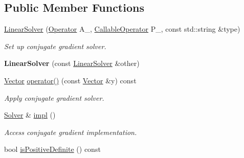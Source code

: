 \subsection*{Public Member Functions}
\begin{DoxyCompactItemize}
\item 
\hyperlink{classSpacy_1_1CG_1_1LinearSolver_a32f75ae5c449772649af6306b6f68497}{Linear\-Solver} (\hyperlink{classSpacy_1_1Operator}{Operator} A\-\_\-, \hyperlink{namespaceSpacy_a022a87afa759e18781dd2aea9a80cd73}{Callable\-Operator} P\-\_\-, const std\-::string \&type)
\begin{DoxyCompactList}\small\item\em Set up conjugate gradient solver. \end{DoxyCompactList}\item 
\hypertarget{classSpacy_1_1CG_1_1LinearSolver_a3c08d3c861d612d92168a350bc66c7dd}{{\bfseries Linear\-Solver} (const \hyperlink{classSpacy_1_1CG_1_1LinearSolver}{Linear\-Solver} \&other)}\label{classSpacy_1_1CG_1_1LinearSolver_a3c08d3c861d612d92168a350bc66c7dd}

\item 
\hypertarget{classSpacy_1_1CG_1_1LinearSolver_a5ee58f9858d840621a44658ceb721850}{\hyperlink{classSpacy_1_1Vector}{Vector} \hyperlink{classSpacy_1_1CG_1_1LinearSolver_a5ee58f9858d840621a44658ceb721850}{operator()} (const \hyperlink{classSpacy_1_1Vector}{Vector} \&y) const }\label{classSpacy_1_1CG_1_1LinearSolver_a5ee58f9858d840621a44658ceb721850}

\begin{DoxyCompactList}\small\item\em Apply conjugate gradient solver. \end{DoxyCompactList}\item 
\hypertarget{classSpacy_1_1CG_1_1LinearSolver_aa0aa5fdfdfd66e186fc86c35d7b49df6}{\hyperlink{classSpacy_1_1CG_1_1Solver}{Solver} \& \hyperlink{classSpacy_1_1CG_1_1LinearSolver_aa0aa5fdfdfd66e186fc86c35d7b49df6}{impl} ()}\label{classSpacy_1_1CG_1_1LinearSolver_aa0aa5fdfdfd66e186fc86c35d7b49df6}

\begin{DoxyCompactList}\small\item\em Access conjugate gradient implementation. \end{DoxyCompactList}\item 
\hypertarget{classSpacy_1_1CG_1_1LinearSolver_adec5404c595dc514a9c81c9ccc06cf41}{bool \hyperlink{classSpacy_1_1CG_1_1LinearSolver_adec5404c595dc514a9c81c9ccc06cf41}{is\-Positive\-Definite} () const }\label{classSpacy_1_1CG_1_1LinearSolver_adec5404c595dc514a9c81c9ccc06cf41}


\end{DoxyCompactItemize}

